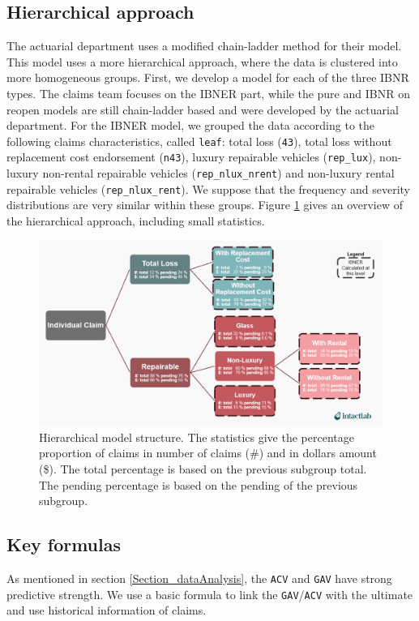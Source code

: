 \subsection{Hierarchical approach}
	The actuarial department uses a modified chain-ladder method for their model. This model uses a more hierarchical approach, where the data is clustered into more homogeneous groups. First, we develop a model for each of the three IBNR types. The claims team focuses on the IBNER part, while the pure and IBNR on reopen models are still chain-ladder based and were developed by the actuarial department. For the IBNER model, we grouped the data according to the following claims characteristics, called \texttt{leaf}:  total loss (\texttt{43}), total loss without replacement cost endorsement (\texttt{n43}), luxury repairable vehicles (\texttt{rep\_lux}), non-luxury non-rental repairable vehicles (\texttt{rep\_nlux\_nrent}) and non-luxury rental repairable vehicles (\texttt{rep\_nlux\_rent}). We suppose that the frequency and severity distributions are very similar within these groups. Figure \ref{Fig_hier_model} gives an overview of the hierarchical approach, including small statistics.
	\begin{figure}[H]
		\begin{center}
			\includegraphics[scale=0.4]{Graphiques/Hier_model} 
			\renewcommand{\figurename}{Figure}
			\caption[Hierarchical model structure]{Hierarchical model structure. The statistics give the percentage proportion of claims in number of claims (\#) and in dollars amount (\$). The total percentage is based on the previous subgroup total. The pending percentage is based on the pending of the previous subgroup.}\label{Fig_hier_model}
		\end{center}
	\end{figure}
 
\subsection{Key formulas}
	As mentioned in section \ref{Section_dataAnalysis}, the \texttt{ACV} and \texttt{GAV} have strong predictive strength. We use a basic formula to link the \texttt{GAV}/\texttt{ACV} with the ultimate and use historical information of claims.

